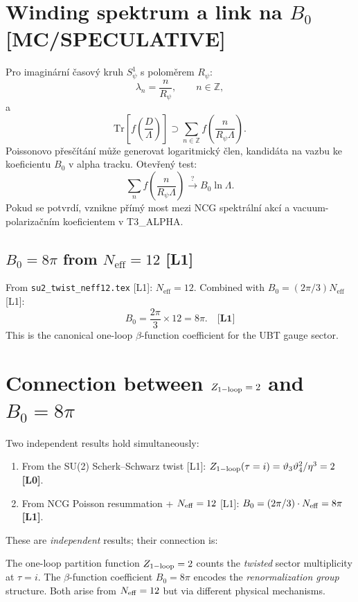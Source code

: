 \documentclass[12pt,a4paper]{article}
\begin{document}
\section{Winding spektrum a link na $B_0$ \,[MC/SPECULATIVE]}

Pro imaginární časový kruh $S^1_\psi$ s poloměrem $R_\psi$:
\[
\lambda_n=\frac{n}{R_\psi},\qquad n\in\mathbb Z,
\]
a
\[
\mathrm{Tr}\!\left[f\!\left(\frac{D}{\Lambda}\right)\right]
\supset \sum_{n\in\mathbb Z} f\!\left(\frac{n}{R_\psi\Lambda}\right).
\]
Poissonovo přesčítání může generovat logaritmický člen, kandidáta na vazbu
ke koeficientu $B_0$ v alpha tracku. Otevřený test:
\[
\sum_n f\!\left(\frac{n}{R_\psi\Lambda}\right)\stackrel{?}{\longrightarrow}B_0\ln\Lambda.
\]
Pokud se potvrdí, vznikne přímý most mezi NCG spektrální akcí a
vacuum-polarizačním koeficientem v T3\_ALPHA.

\subsection{$B_0 = 8\pi$ from $N_{\mathrm{eff}}=12$ [L1]}
From \texttt{su2\_twist\_neff12.tex} [L1]: \(N_{\mathrm{eff}}=12\).
Combined with \(B_0=(2\pi/3)N_{\mathrm{eff}}\) [L1]:
\begin{equation}
  B_0 = \frac{2\pi}{3}\times 12 = 8\pi. \quad \textbf{[L1]}
\end{equation}
This is the canonical one-loop \(\beta\)-function coefficient for the
UBT gauge sector.

\section{Connection between $Z_{\rm 1-loop}=2$ and $B_0=8\pi$}
\label{sec:Z-B0-connection}

Two independent results hold simultaneously:
\begin{enumerate}
\item From the SU(2) Scherk--Schwarz twist [L1]:
  $Z_{\rm 1-loop}(\tau=i) = \vartheta_3\vartheta_4^2/\eta^3 = 2$
  \textbf{[L0]}.

\item From NCG Poisson resummation + $N_{\rm eff}=12$ [L1]:
  $B_0 = (2\pi/3)\cdot N_{\rm eff} = 8\pi$ \textbf{[L1]}.
\end{enumerate}

These are \emph{independent} results; their connection is:

The one-loop partition function $Z_{\rm 1-loop}=2$ counts
the \emph{twisted} sector multiplicity at $\tau=i$.
The $\beta$-function coefficient $B_0=8\pi$ encodes the
\emph{renormalization group} structure.
Both arise from $N_{\rm eff}=12$ but via different physical mechanisms.
\end{document}
